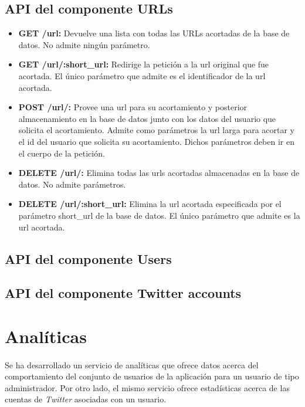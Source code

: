 \documentclass[a4paper]{article}
\begin{document}
	\subsection{API del componente URLs}
	\begin{itemize}
		\item \textbf{GET /url:} Devuelve una lista con todas las URLs acortadas de la base de datos. No admite ningún parámetro.
		\item \textbf{GET /url/:short\_url:} Redirige la petición a la url original que fue acortada. El único parámetro que admite es el identificador de la url acortada.
		\item \textbf{POST /url/:} Provee una url para su acortamiento y posterior almacenamiento en la base de datos junto con los datos del usuario que solicita el acortamiento. Admite como parámetros la url larga para acortar y el id del usuario que solicita su acortamiento. Dichos parámetros deben ir en el cuerpo de la petición.
		\item \textbf{DELETE /url/:} Elimina todas las urls acortadas almacenadas en la base de datos. No admite parámetros.
		\item \textbf{DELETE /url/:short\_url:} Elimina la url acortada especificada por el parámetro short\_url de la base de datos. El único parámetro que admite es la url acortada.
	\end{itemize}
	
	\subsection{API del componente Users}
	
	\subsection{API del componente Twitter accounts}
\section{Analíticas}

	\paragraph{} Se ha desarrollado un servicio de analíticas que ofrece datos acerca del comportamiento del conjunto de usuarios de la aplicación para un usuario de tipo administrador. Por otro lado, el mismo servicio ofrece estadísticas acerca de las cuentas de \textit{Twitter} asociadas con un usuario.
	
\end{document}
